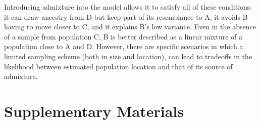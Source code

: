 \documentclass[12pt]{article}
\begin{document}
Introducing admixture into the model allows it to satisfy all of these conditions: it can draw ancestry from D but keep part of its resemblance to A, it avoids B having to move closer to C, and it explains B's low variance.  Even in the absence of a sample from population C, B is better described as a linear mixture of a population close to A and D.  However, there are specific scenarios in which a limited sampling scheme (both in size and location), can lead to tradeoffs in the likelihood between estimated population location and that of its source of admixture.

\newpage



\newpage


\section*{Supplementary Materials}
\end{document}

